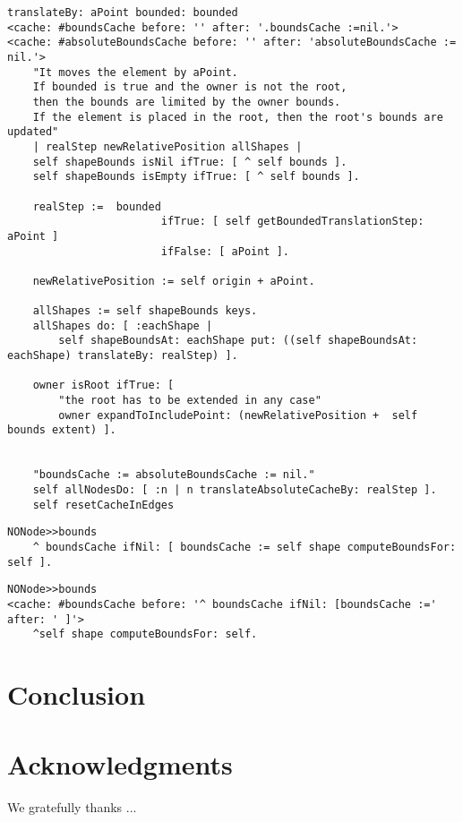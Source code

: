 \documentclass[runningheads]{llncs}
\newcommand{\seclabel}[1]{\label{sec:#1}}
\begin{document}
\begin{lstlisting}
translateBy: aPoint bounded: bounded
<cache: #boundsCache before: '' after: '.boundsCache :=nil.'>
<cache: #absoluteBoundsCache before: '' after: 'absoluteBoundsCache := nil.'>
	"It moves the element by aPoint. 
	If bounded is true and the owner is not the root, 
	then the bounds are limited by the owner bounds.
	If the element is placed in the root, then the root's bounds are updated"
	| realStep newRelativePosition allShapes |
	self shapeBounds isNil ifTrue: [ ^ self bounds ].
	self shapeBounds isEmpty ifTrue: [ ^ self bounds ].

	realStep :=  bounded 
						ifTrue: [ self getBoundedTranslationStep: aPoint ]
						ifFalse: [ aPoint ].			

	newRelativePosition := self origin + aPoint.	

	allShapes := self shapeBounds keys.
	allShapes do: [ :eachShape | 
		self shapeBoundsAt: eachShape put: ((self shapeBoundsAt: eachShape) translateBy: realStep) ].
	
	owner isRoot ifTrue: [
		"the root has to be extended in any case"
		owner expandToIncludePoint: (newRelativePosition +  self bounds extent) ].
	
	
	"boundsCache := absoluteBoundsCache := nil."
	self allNodesDo: [ :n | n translateAbsoluteCacheBy: realStep ].
	self resetCacheInEdges
\end{lstlisting}

\begin{lstlisting}
NONode>>bounds
	^ boundsCache ifNil: [ boundsCache := self shape computeBoundsFor: self ].
\end{lstlisting}

\begin{lstlisting}
NONode>>bounds
<cache: #boundsCache before: '^ boundsCache ifNil: [boundsCache :=' after: ' ]'>
	^self shape computeBoundsFor: self.
\end{lstlisting}

\section{Conclusion}\seclabel{conclusion}



\section*{Acknowledgments}

\small We gratefully thanks ...



\end{document}
